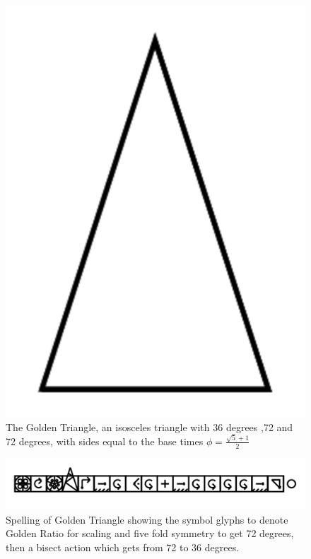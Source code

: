 \documentclass[11pt]{book}
\begin{document}
\begin{figure}

\includegraphics[width=\linewidth]{../figures/golden1.png}

\caption{The Golden Triangle, an isosceles triangle with 36 degrees ,72 and 72 degrees, with sides equal to the base times $\phi = \frac{\sqrt{5}+1}{2}$}
\end{figure}


\begin{figure}

\includegraphics[width=\linewidth]{../figures/spellgolden1.png}

\caption{Spelling of Golden Triangle showing the symbol glyphs to denote Golden Ratio for scaling and five fold symmetry to get 72 degrees, then a bisect action which gets from 72 to 36 degrees.}
\end{figure}
\end{document}
